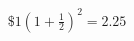 \documentclass[preview]{standalone}
\begin{document}
\begin{align*}
\$1\left( 1+\frac{1}{2} \right)^{2} = 2.25
\end{align*}
\end{document}
